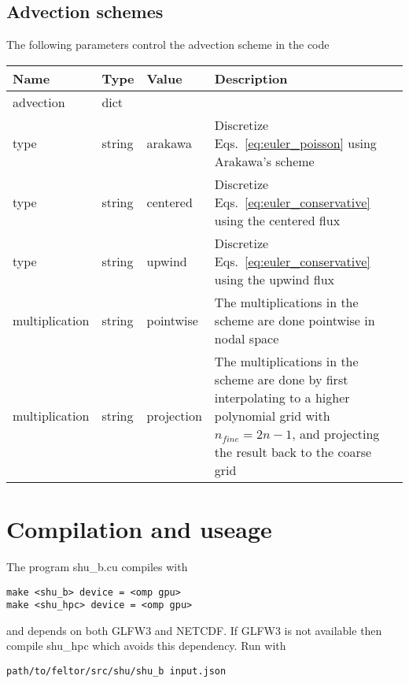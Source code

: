\subsection{Advection schemes}
The following parameters control the advection scheme in the code
\begin{longtable}{lllp{7.5cm}}
\toprule
\rowcolor{gray!50}\textbf{Name} &  \textbf{Type} & \textbf{Value}  & \textbf{Description}  \\ \midrule
advection & dict & & \\
\qquad type  & string& arakawa & Discretize Eqs.~\eqref{eq:euler_poisson} using Arakawa's scheme \cite{Einkemmer2014} \\
\qquad type  & string& centered & Discretize Eqs.~\eqref{eq:euler_conservative} using the centered flux \\
\qquad type  & string& upwind & Discretize Eqs.~\eqref{eq:euler_conservative} using the upwind flux \\
\qquad multiplication    & string & pointwise & The multiplications in the scheme
are done pointwise in nodal space\\
\qquad multiplication    & string & projection & The multiplications in the scheme
are done by first interpolating to a higher polynomial grid with $n_{fine} = 2n -1$, and projecting the result back to the coarse grid\\
\bottomrule
\end{longtable}

\section{Compilation and useage}
The program shu\_b.cu compiles with
\begin{verbatim}
make <shu_b> device = <omp gpu>
make <shu_hpc> device = <omp gpu>
\end{verbatim}
and depends on both GLFW3 and NETCDF. If GLFW3 is not available then compile shu\_hpc which avoids this dependency.
Run with
\begin{verbatim}
path/to/feltor/src/shu/shu_b input.json
\end{verbatim}

